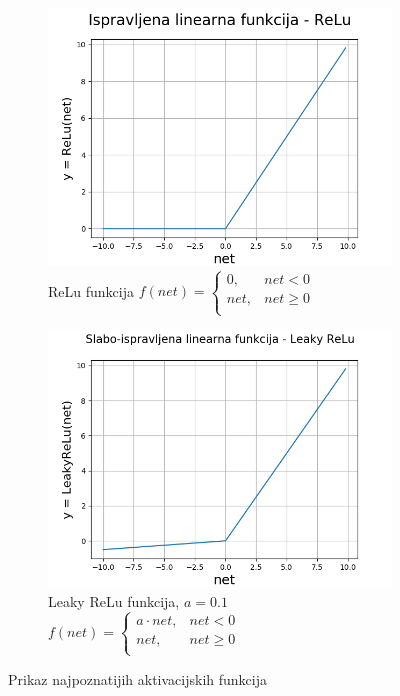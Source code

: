 \documentclass[times, utf8, diplomski]{fer}
\theoremstyle{definition}
\begin{document}
\begin{figure}
\begin{subfigure}[t]{.5\textwidth}
\centering
\includegraphics[width=\linewidth]{relu_funkcija.png}
\caption{ReLu funkcija
\centering
$
f(net) = \begin{cases}
0, & net < 0\\
net, & net \geq 0\\
\end{cases}
$
}
\end{subfigure}
\hfill
\begin{subfigure}[t]{.5\textwidth}
\centering
\includegraphics[width=\linewidth]{lrelu_funkcija.png}
\caption{Leaky ReLu funkcija, $a=0.1$
\centering
$
f(net) = \begin{cases}
a \cdot net, & net < 0\\
net, & net \geq 0\\
\end{cases}
$
}
\end{subfigure}
\caption{Prikaz najpoznatijih aktivacijskih funkcija}
\label{fig:activation_functions}
\end{figure}
\end{document}
